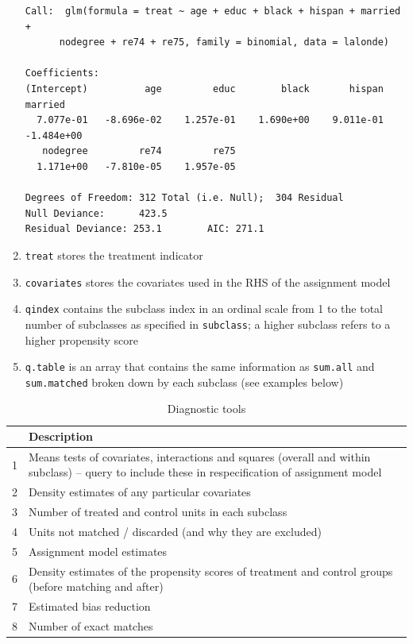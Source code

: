 \documentclass[oneside,letterpaper,titlepage]{article}
\begin{document}
\begin{enumerate}
\begin{footnotesize}
\begin{verbatim}
Call:  glm(formula = treat ~ age + educ + black + hispan + married +
      nodegree + re74 + re75, family = binomial, data = lalonde) 

Coefficients:
(Intercept)          age         educ        black       hispan      married  
  7.077e-01   -8.696e-02    1.257e-01    1.690e+00    9.011e-01   -1.484e+00  
   nodegree         re74         re75  
  1.171e+00   -7.810e-05    1.957e-05  

Degrees of Freedom: 312 Total (i.e. Null);  304 Residual
Null Deviance:      423.5 
Residual Deviance: 253.1        AIC: 271.1 
\end{verbatim}
\end{footnotesize}

\item \texttt{treat} stores the treatment indicator

\item \texttt{covariates} stores the covariates used in the RHS of the
  assignment model

\item \texttt{qindex} contains the subclass index in an ordinal scale
  from 1 to the total number of subclasses as specified in
  \texttt{subclass}; a higher subclass refers to a higher propensity
  score

\item \texttt{q.table} is an array that contains the same
  information as \texttt{sum.all} and \texttt{sum.matched} broken
  down by each subclass (see examples below) 

\end{enumerate}

\begin{table}[tbp]
  \begin{center}
    \small
    \begin{tabular}{lp{5in}}
      \hline
      & Description \\ 
      \hline
      1 & Means tests of covariates, interactions and squares (overall and
      within subclass) -- query to include these in respecification of
      assignment model\\
      2& Density estimates of any particular covariates \\
      3& Number of treated and control units in each subclass \\
      4& Units not matched / discarded (and why they are excluded) \\
      5& Assignment model estimates \\
      6& Density estimates of the propensity scores of treatment and
      control groups (before matching and after) \\
      7&Estimated bias reduction\\
      8&Number of exact matches\\
      \hline
    \end{tabular}
    \caption{Diagnostic tools}
    \label{diagnostic}
  \end{center}
\end{table}
\end{document}
